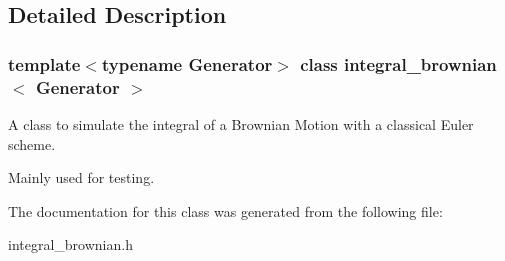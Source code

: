 \subsection{Detailed Description}
\subsubsection*{template$<$typename Generator$>$\newline
class integral\+\_\+brownian$<$ Generator $>$}

A class to simulate the integral of a Brownian Motion with a classical Euler scheme. 

Mainly used for testing. 

The documentation for this class was generated from the following file\+:\begin{DoxyCompactItemize}
\item 
integral\+\_\+brownian.\+h\end{DoxyCompactItemize}
